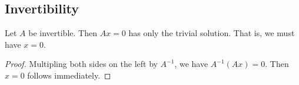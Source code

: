 \subsection{Invertibility}\label{a07fedd}

\label{e98364f}

Let $A$ be invertible. Then $Ax=0$ has only the trivial solution. That is, we
must have $x=0$.

\begin{proof}
  Multipling both sides on the left by $A^{-1}$, we have $A^{-1}(Ax)=0$. Then
  $x=0$ follows immediately.
\end{proof}

